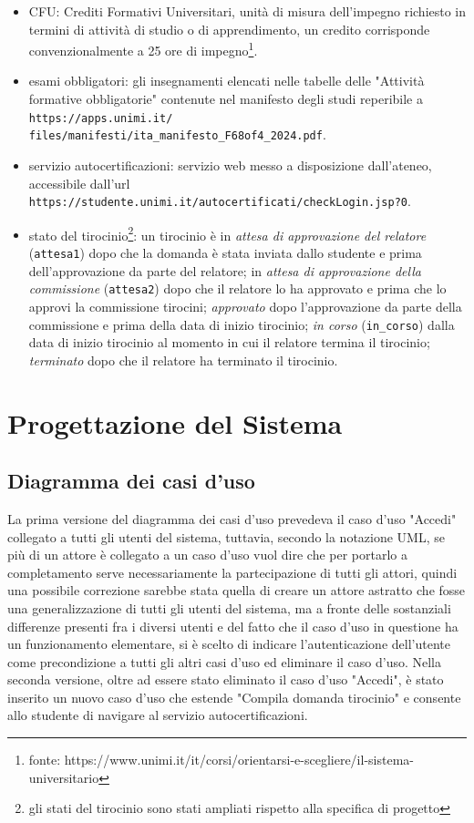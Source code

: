 \documentclass[12pt]{article}
\begin{document}
\begin{itemize} %
   \item CFU: Crediti Formativi Universitari, unità di misura dell’impegno richiesto in termini di attività di studio o di apprendimento, un credito corrisponde convenzionalmente a 25 ore di impegno\footnote{fonte: https://www.unimi.it/it/corsi/orientarsi-e-scegliere/il-sistema-universitario}.
   \item esami obbligatori: gli insegnamenti elencati nelle tabelle delle "Attività formative obbligatorie" contenute nel manifesto degli studi reperibile a \texttt{https://apps.unimi.it/} \texttt{files/manifesti/ita\_manifesto\_F68of4\_2024.pdf}.
   \item servizio autocertificazioni: servizio web messo a disposizione dall'ateneo, accessibile dall'url \texttt{https://studente.unimi.it/autocertificati/checkLogin.jsp?0}.
   \item stato del tirocinio\footnote{gli stati del tirocinio sono stati ampliati rispetto alla specifica di progetto}: un tirocinio è in \emph{attesa di approvazione del relatore} (\texttt{attesa1}) dopo che la domanda è stata inviata dallo studente e prima dell'approvazione da parte del relatore; in \emph{attesa di approvazione della commissione} (\texttt{attesa2}) dopo che il relatore lo ha approvato e prima che lo approvi la commissione tirocini; \emph{approvato} dopo l'approvazione da parte della commissione e prima della data di inizio tirocinio; \emph{in corso} (\texttt{in\_corso}) dalla data di inizio tirocinio al momento in cui il relatore termina il tirocinio; \emph{terminato} dopo che il relatore ha terminato il tirocinio.
\end{itemize}

\section{Progettazione del Sistema}
\subsection{Diagramma dei casi d'uso}

La prima versione del diagramma dei casi d'uso prevedeva il caso d'uso "Accedi" collegato a tutti gli utenti del sistema, tuttavia, secondo la notazione UML, se più di un attore è collegato a un caso d'uso vuol dire che per portarlo a completamento serve necessariamente la partecipazione di tutti gli attori, quindi una possibile correzione sarebbe stata quella di creare un attore astratto che fosse una generalizzazione di tutti gli utenti del sistema, ma a fronte delle sostanziali differenze presenti fra i diversi utenti e del fatto che il caso d'uso in questione ha un funzionamento elementare, si è scelto di indicare l'autenticazione dell'utente come precondizione a tutti gli altri casi d'uso ed eliminare il caso d'uso.
Nella seconda versione, oltre ad essere stato eliminato il caso d'uso "Accedi", è stato inserito un nuovo caso d'uso che estende "Compila domanda tirocinio" e consente allo studente di navigare al servizio autocertificazioni.
\end{document}
